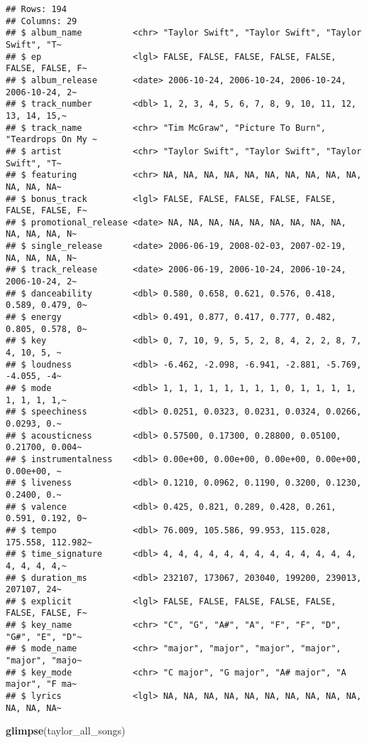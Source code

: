 \documentclass[
]{article}
\newenvironment{Shaded}{\begin{snugshade}}{\end{snugshade}}
\newcommand{\FunctionTok}[1]{\textcolor[rgb]{0.13,0.29,0.53}{\textbf{#1}}}
\newcommand{\NormalTok}[1]{#1}
\begin{document}
\begin{verbatim}
## Rows: 194
## Columns: 29
## $ album_name          <chr> "Taylor Swift", "Taylor Swift", "Taylor Swift", "T~
## $ ep                  <lgl> FALSE, FALSE, FALSE, FALSE, FALSE, FALSE, FALSE, F~
## $ album_release       <date> 2006-10-24, 2006-10-24, 2006-10-24, 2006-10-24, 2~
## $ track_number        <dbl> 1, 2, 3, 4, 5, 6, 7, 8, 9, 10, 11, 12, 13, 14, 15,~
## $ track_name          <chr> "Tim McGraw", "Picture To Burn", "Teardrops On My ~
## $ artist              <chr> "Taylor Swift", "Taylor Swift", "Taylor Swift", "T~
## $ featuring           <chr> NA, NA, NA, NA, NA, NA, NA, NA, NA, NA, NA, NA, NA~
## $ bonus_track         <lgl> FALSE, FALSE, FALSE, FALSE, FALSE, FALSE, FALSE, F~
## $ promotional_release <date> NA, NA, NA, NA, NA, NA, NA, NA, NA, NA, NA, NA, N~
## $ single_release      <date> 2006-06-19, 2008-02-03, 2007-02-19, NA, NA, NA, N~
## $ track_release       <date> 2006-06-19, 2006-10-24, 2006-10-24, 2006-10-24, 2~
## $ danceability        <dbl> 0.580, 0.658, 0.621, 0.576, 0.418, 0.589, 0.479, 0~
## $ energy              <dbl> 0.491, 0.877, 0.417, 0.777, 0.482, 0.805, 0.578, 0~
## $ key                 <dbl> 0, 7, 10, 9, 5, 5, 2, 8, 4, 2, 2, 8, 7, 4, 10, 5, ~
## $ loudness            <dbl> -6.462, -2.098, -6.941, -2.881, -5.769, -4.055, -4~
## $ mode                <dbl> 1, 1, 1, 1, 1, 1, 1, 1, 0, 1, 1, 1, 1, 1, 1, 1, 1,~
## $ speechiness         <dbl> 0.0251, 0.0323, 0.0231, 0.0324, 0.0266, 0.0293, 0.~
## $ acousticness        <dbl> 0.57500, 0.17300, 0.28800, 0.05100, 0.21700, 0.004~
## $ instrumentalness    <dbl> 0.00e+00, 0.00e+00, 0.00e+00, 0.00e+00, 0.00e+00, ~
## $ liveness            <dbl> 0.1210, 0.0962, 0.1190, 0.3200, 0.1230, 0.2400, 0.~
## $ valence             <dbl> 0.425, 0.821, 0.289, 0.428, 0.261, 0.591, 0.192, 0~
## $ tempo               <dbl> 76.009, 105.586, 99.953, 115.028, 175.558, 112.982~
## $ time_signature      <dbl> 4, 4, 4, 4, 4, 4, 4, 4, 4, 4, 4, 4, 4, 4, 4, 4, 4,~
## $ duration_ms         <dbl> 232107, 173067, 203040, 199200, 239013, 207107, 24~
## $ explicit            <lgl> FALSE, FALSE, FALSE, FALSE, FALSE, FALSE, FALSE, F~
## $ key_name            <chr> "C", "G", "A#", "A", "F", "F", "D", "G#", "E", "D"~
## $ mode_name           <chr> "major", "major", "major", "major", "major", "majo~
## $ key_mode            <chr> "C major", "G major", "A# major", "A major", "F ma~
## $ lyrics              <lgl> NA, NA, NA, NA, NA, NA, NA, NA, NA, NA, NA, NA, NA~
\end{verbatim}

\begin{Shaded}
\begin{Highlighting}[]
\FunctionTok{glimpse}\NormalTok{(taylor\_all\_songs)}
\end{Highlighting}
\end{Shaded}
\end{document}

